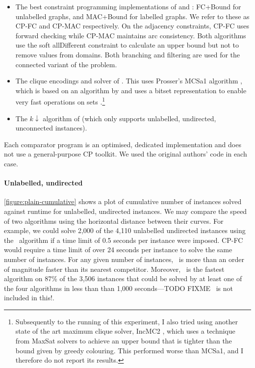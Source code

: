 \begin{itemize}
\item The best constraint
programming implementations of \citet{DBLP:conf/cp/NdiayeS11} and
\citet{DBLP:conf/cp/McCreeshNPS16}:
FC+Bound for unlabelled graphs,
and MAC+Bound for labelled graphs.  We refer to these as CP-FC and
CP-MAC respectively.  On the adjacency constraints, CP-FC uses forward checking
while CP-MAC maintains arc consistency.
Both algorithms use the soft allDifferent constraint to calculate
an upper bound but not to remove values from domains.
Both branching and filtering are used for the connected variant of
the problem.
\item The clique encodings and solver of \citet{DBLP:conf/cp/McCreeshNPS16}.
This uses Prosser's MCSa1 algorithm \citep{DBLP:journals/algorithms/Prosser12}, which is
based on an algorithm by \citet{DBLP:journals/ieicet/TomitaSHW13} and uses a
bitset representation to enable very fast operations on sets
\citep{DBLP:journals/cor/SegundoRJ11}.\footnote{
Subsequently to the running of this experiment,
I also tried using another state of the
art maximum clique solver, IncMC2 \citep{DBLP:journals/informs/LiFJX18}, which
uses a technique from MaxSat solvers to achieve an upper bound that is tighter
than the bound given by greedy colouring.
This performed worse than MCSa1, and I therefore do not report its
results.}
\item The
$k{\downarrow}$ algorithm of \citet{UpcomingAAAIPaper} (which only supports
unlabelled, undirected, unconnected instances).
\end{itemize}

Each comparator
program is an optimised, dedicated implementation and does not use a
general-purpose CP toolkit.  We used the original authors'
code in each case.







\paragraph{Unlabelled, undirected}
\cref{figure:plain-cumulative} shows a plot of cumulative 
number of instances solved against runtime for unlabelled, undirected
instances.  We may compare
the speed of two algorithms using the horizontal distance between their curves.
For example, we could solve 2,000 of the 4,110 unlabelled undirected instances
using the \McSplit\ algorithm if a time limit of 0.5 seconds per instance were
imposed.  CP-FC would require a time limit of over 24
seconds per instance to solve the same number of instances.  For any given
number of instances, \McSplit\ is more than an order of magnitude
faster than its nearest competitor.  Moreover, \McSplit\ is the fastest algorithm
on 87\% of the 3,506 instances that
could be solved by at least one of the four algorithms in less than than
1,000 seconds---TODO FIXME \kDown\ is not included in this!.

